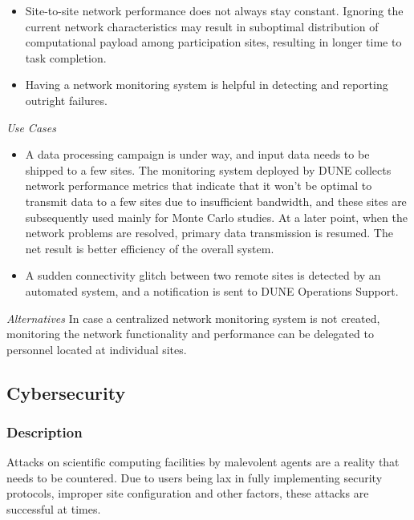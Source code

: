 \begin{itemize}
	
	\item Site-to-site network performance does not always stay constant. Ignoring the current network characteristics 
	may result in suboptimal distribution of computational payload among participation sites, resulting in longer time to task 
	completion.
	
	\item Having a network monitoring system is helpful in detecting and reporting outright failures.
	
\end{itemize}
\noindent
\textit{Use Cases}
\begin{itemize}
	\item A data processing campaign is under way, and input data needs to be shipped to a few sites. 
	The monitoring system deployed by DUNE collects network performance metrics that indicate that it
	won't be optimal to transmit data to a few sites due to insufficient bandwidth, and these sites are 
	subsequently used mainly for Monte Carlo studies. At a later point, when the network problems are resolved, primary data transmission is resumed.  The net result is better efficiency of the overall system.
	
	\item A sudden connectivity glitch between two remote sites is detected by an automated system,
	and a  notification is sent to DUNE Operations Support.
\end{itemize}
\noindent
\textit{Alternatives}
\noindent
In case a centralized network monitoring system is not created, monitoring the network
functionality and performance can  be delegated to personnel located at individual sites.

\newpage
\subsection{Cybersecurity}
\subsubsection{Description}
Attacks on scientific computing facilities by malevolent agents are a reality that needs to be countered. Due to users being lax in fully implementing security protocols, improper site configuration and other factors, these attacks are successful at times.

